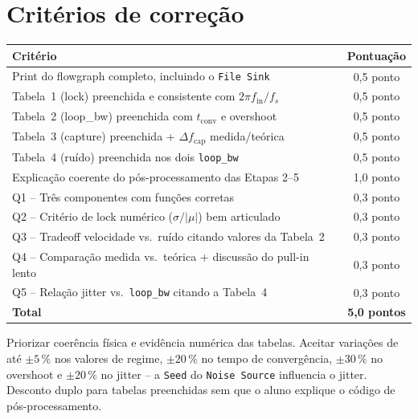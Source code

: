 \documentclass[11pt,a4paper]{article}
\begin{document}
\section*{Critérios de correção}
\begin{tabular}{lc}
  \toprule
  Critério & Pontuação \\
  \midrule
  Print do flowgraph completo, incluindo o \texttt{File Sink}    & 0,5 ponto \\
  Tabela~1 (lock) preenchida e consistente com $2\pi f_\text{in}/f_s$ & 0,5 ponto \\
  Tabela~2 (loop\_bw) preenchida com $t_\text{conv}$ e overshoot & 0,5 ponto \\
  Tabela~3 (capture) preenchida + $\Delta f_\text{cap}$ medida/teórica & 0,5 ponto \\
  Tabela~4 (ruído) preenchida nos dois \texttt{loop\_bw}          & 0,5 ponto \\
  Explicação coerente do pós-processamento das Etapas 2--5         & 1,0 ponto \\
  Q1 -- Três componentes com funções corretas                       & 0,3 ponto \\
  Q2 -- Critério de lock numérico ($\sigma/|\mu|$) bem articulado   & 0,3 ponto \\
  Q3 -- Tradeoff velocidade vs.\ ruído citando valores da Tabela~2  & 0,3 ponto \\
  Q4 -- Comparação medida vs.\ teórica + discussão do pull-in lento & 0,3 ponto \\
  Q5 -- Relação jitter vs.\ \texttt{loop\_bw} citando a Tabela~4    & 0,3 ponto \\
  \midrule
  \textbf{Total} & \textbf{5,0 pontos} \\
  \bottomrule
\end{tabular}

\bigskip
\begin{nota}
  Priorizar coerência física e evidência numérica das tabelas. Aceitar
  variações de até $\pm 5\,\%$ nos valores de regime, $\pm 20\,\%$ no tempo
  de convergência, $\pm 30\,\%$ no overshoot e $\pm 20\,\%$ no jitter -- a
  \texttt{Seed} do \texttt{Noise Source} influencia o jitter. Desconto duplo
  para tabelas preenchidas sem que o aluno explique o código de pós-processamento.
\end{nota}
\end{document}
